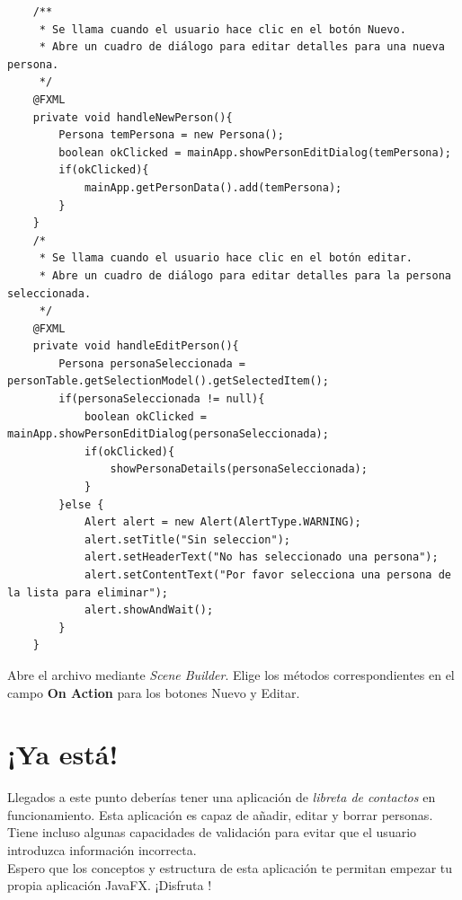 \begin{verbatim}
    /**
	 * Se llama cuando el usuario hace clic en el botón Nuevo.
	 * Abre un cuadro de diálogo para editar detalles para una nueva persona.
	 */
	@FXML
	private void handleNewPerson(){
		Persona temPersona = new Persona();
		boolean okClicked = mainApp.showPersonEditDialog(temPersona);
		if(okClicked){
			mainApp.getPersonData().add(temPersona);
		}
	}
	/*
	 * Se llama cuando el usuario hace clic en el botón editar.
	 * Abre un cuadro de diálogo para editar detalles para la persona seleccionada.
	 */
	@FXML
	private void handleEditPerson(){
		Persona personaSeleccionada = personTable.getSelectionModel().getSelectedItem();
		if(personaSeleccionada != null){
			boolean okClicked = mainApp.showPersonEditDialog(personaSeleccionada);
			if(okClicked){
				showPersonaDetails(personaSeleccionada);
			}
		}else {
			Alert alert = new Alert(AlertType.WARNING);
			alert.setTitle("Sin seleccion");
			alert.setHeaderText("No has seleccionado una persona");
			alert.setContentText("Por favor selecciona una persona de la lista para eliminar");
			alert.showAndWait();
		}
	}
\end{verbatim}
Abre el archivo  mediante \textit{Scene Builder}. 
Elige los métodos correspondientes en el campo \textbf{On Action} para los botones Nuevo y Editar.

\section{¡Ya está!}
Llegados a este punto deberías tener una aplicación de \textit{libreta de contactos} en funcionamiento. 
Esta aplicación es capaz de añadir, editar y borrar personas. Tiene incluso algunas capacidades de 
validación para evitar que el usuario introduzca información incorrecta.\\
Espero que los conceptos y estructura de esta aplicación te permitan empezar tu propia aplicación JavaFX. ¡Disfruta !